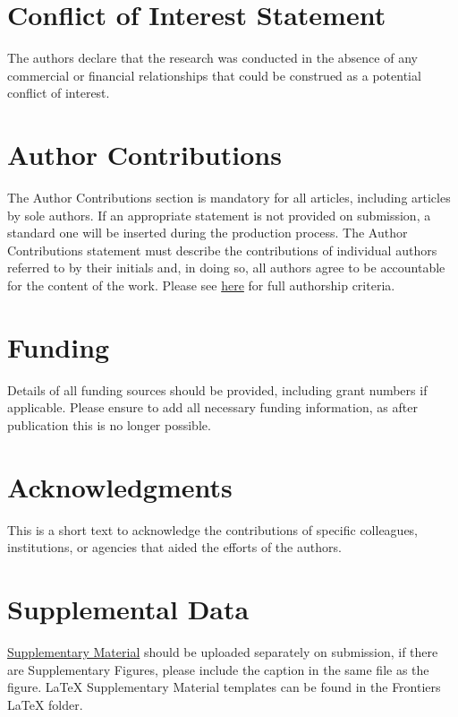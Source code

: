 \documentclass[utf8]{frontiersSCNS} %
\begin{document}
\section*{Conflict of Interest Statement}

The authors declare that the research was conducted in the absence of any commercial or financial relationships that could be construed as a potential conflict of interest.

\section*{Author Contributions}

The Author Contributions section is mandatory for all articles, including articles by sole authors. If an appropriate statement is not provided on submission, a standard one will be inserted during the production process. The Author Contributions statement must describe the contributions of individual authors referred to by their initials and, in doing so, all authors agree to be accountable for the content of the work. Please see  \href{http://home.frontiersin.org/about/author-guidelines#AuthorandContributors}{here} for full authorship criteria.

\section*{Funding}
Details of all funding sources should be provided, including grant numbers if applicable. Please ensure to add all necessary funding information, as after publication this is no longer possible.

\section*{Acknowledgments}
This is a short text to acknowledge the contributions of specific colleagues, institutions, or agencies that aided the efforts of the authors.

\section*{Supplemental Data}
 \href{http://home.frontiersin.org/about/author-guidelines#SupplementaryMaterial}{Supplementary Material} should be uploaded separately on submission, if there are Supplementary Figures, please include the caption in the same file as the figure. LaTeX Supplementary Material templates can be found in the Frontiers LaTeX folder.
\end{document}
